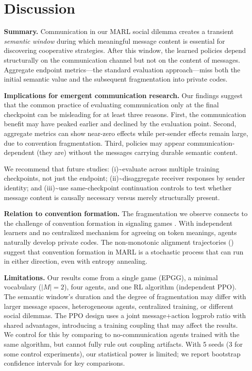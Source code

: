\documentclass[
  10pt,
  letterpaper,
]{article}
\begin{document}
\hypertarget{sec-discussion}{%
\section{Discussion}\label{sec-discussion}}

\textbf{Summary.} Communication in our MARL social dilemma creates a
transient \emph{semantic window} during which meaningful message content
is essential for discovering cooperative strategies. After this window,
the learned policies depend structurally on the communication channel
but not on the content of messages. Aggregate endpoint metrics---the
standard evaluation approach---miss both the initial semantic value and
the subsequent fragmentation into private codes.

\textbf{Implications for emergent communication research.} Our findings
suggest that the common practice of evaluating communication only at the
final checkpoint can be misleading for at least three reasons. First,
the communication benefit may have peaked earlier and declined by the
evaluation point. Second, aggregate metrics can show near-zero effects
while per-sender effects remain large, due to convention fragmentation.
Third, policies may appear communication-dependent (they are) without
the messages carrying durable semantic content.

We recommend that future studies: (i)\textasciitilde evaluate across
multiple training checkpoints, not just the endpoint;
(ii)\textasciitilde disaggregate receiver responses by sender identity;
and (iii)\textasciitilde use same-checkpoint continuation controls to
test whether message content is causally necessary versus merely
structurally present.

\textbf{Relation to convention formation.} The fragmentation we observe
connects to the challenge of convention formation in signaling games
\citep{lewis1969convention, skyrms2010signals}. With independent
learners and no centralized mechanism for agreeing on token meanings,
agents naturally develop private codes. The non-monotonic alignment
trajectories (\citet{tab:alignment}) suggest that convention formation
in MARL is a stochastic process that can run in either direction, even
with entropy annealing.

\textbf{Limitations.} Our results come from a single game (EPGG), a
minimal vocabulary (\(|M|=2\)), four agents, and one RL algorithm
(independent PPO). The semantic window's duration and the degree of
fragmentation may differ with larger message spaces, heterogeneous
agents, centralized training, or different social dilemmas. The PPO
design uses a joint message+action logprob ratio with shared advantages,
introducing a training coupling that may affect the results. We control
for this by comparing to no-communication agents trained with the same
algorithm, but cannot fully rule out coupling artifacts. With 5 seeds (3
for some control experiments), our statistical power is limited; we
report bootstrap confidence intervals for key comparisons.
\end{document}
